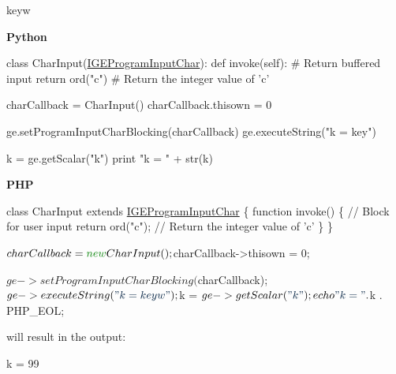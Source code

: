 \begin{DoxyItemize}
\item {\ttfamily keyw}
\end{DoxyItemize}

{\bfseries Python} 
\begin{DoxyCode}
\textcolor{keyword}{class }CharInput(\hyperlink{class_i_g_e_program_input_char}{IGEProgramInputChar}):
    \textcolor{keyword}{def }invoke(self):
        \textcolor{comment}{# Return buffered input}
        \textcolor{keywordflow}{return} ord(\textcolor{stringliteral}{"c"}) \textcolor{comment}{# Return the integer value of 'c'}

charCallback = CharInput()
charCallback.thisown = 0

ge.setProgramInputCharBlocking(charCallback)
ge.executeString(\textcolor{stringliteral}{"k = key"})

k = ge.getScalar(\textcolor{stringliteral}{"k"})
\textcolor{keywordflow}{print} \textcolor{stringliteral}{"k = "} + str(k)
\end{DoxyCode}


{\bfseries P\+HP} 
\begin{DoxyCode}
\textcolor{keyword}{class }CharInput \textcolor{keyword}{extends} \hyperlink{class_i_g_e_program_input_char}{IGEProgramInputChar} \{
    \textcolor{keyword}{function} invoke() \{
        \textcolor{comment}{// Block for user input}
        \textcolor{keywordflow}{return} ord(\textcolor{stringliteral}{"c"}); \textcolor{comment}{// Return the integer value of 'c'}
    \}
\}

$charCallback = \textcolor{keyword}{new} CharInput();
$charCallback->thisown = 0;

$ge->setProgramInputCharBlocking($charCallback);
$ge->executeString(\textcolor{stringliteral}{"k = keyw"});

$k = $ge->getScalar(\textcolor{stringliteral}{"k"});
echo \textcolor{stringliteral}{"k = "} . $k . PHP\_EOL;
\end{DoxyCode}


will result in the output\+: 
\begin{DoxyCode}
k = 99
\end{DoxyCode}



